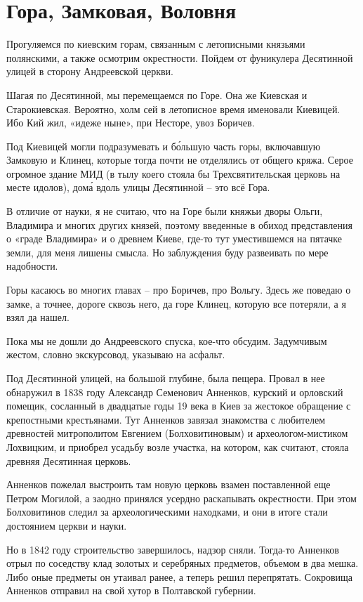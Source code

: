 \chapter{Гора, Замковая, Воловня}

Прогуляемся по киевским горам, связанным с летописными князьями полянскими, а также осмотрим окрестности. Пойдем от фуникулера  Десятинной улицей в сторону Андреевской церкви.

Шагая по Десятинной, мы перемещаемся по Горе. Она же Киевская и Старокиевская. Вероятно, холм сей в летописное время именовали Киевицей. Ибо Кий жил, «идеже ныне», при Несторе, увоз Боричев.

Под Киевицей могли подразумевать и б\'ольшую часть горы, включавшую Замковую и Клинец, которые тогда почти не отделялись от общего кряжа. Серое огромное здание МИД (в тылу коего стояла бы Трехсвятительская церковь на месте идолов), дом\'а вдоль улицы Десятинной – это всё Гора.

В отличие от науки, я не считаю, что на Горе были княжьи дворы Ольги, Владимира и многих других князей, поэтому введенные в обиход представления о «граде Владимира» и о древнем Киеве, где-то тут уместившемся на пятачке земли, для меня лишены смысла. Но заблуждения буду развеивать по мере надобности.

Горы касаюсь во многих главах – про Боричев, про Вольгу. Здесь же поведаю о замке, а точнее, дороге сквозь него, да горе Клинец, которую все потеряли, а я взял да нашел.

Пока мы не дошли до Андреевского спуска, кое-что обсудим. Задумчивым жестом, словно экскурсовод, указываю на асфальт.

Под Десятинной улицей, на большой глубине, была пещера. Провал в нее обнаружил в 1838 году Александр Семенович Анненков, курский и орловский помещик, сосланный в двадцатые годы 19 века в Киев за жестокое обращение с крепостными крестьянами. Тут Анненков завязал знакомства с любителем древностей митрополитом Евгением (Болховитиновым) и археологом-мистиком Лохвицким, и приобрел усадьбу возле участка, на котором, как считают, стояла древняя Десятинная церковь.

Анненков пожелал выстроить там новую церковь взамен поставленной еще Петром Могилой, а заодно принялся усердно раскапывать окрестности. При этом Болховитинов следил за археологическими находками, и они в итоге стали достоянием церкви и науки.

Но в 1842 году строительство завершилось, надзор сняли. Тогда-то Анненков отрыл по соседству клад золотых и серебряных предметов, объемом в два мешка. Либо оные предметы он утаивал ранее, а теперь решил перепрятать. Сокровища Анненков отправил на свой хутор в Полтавской губернии.

